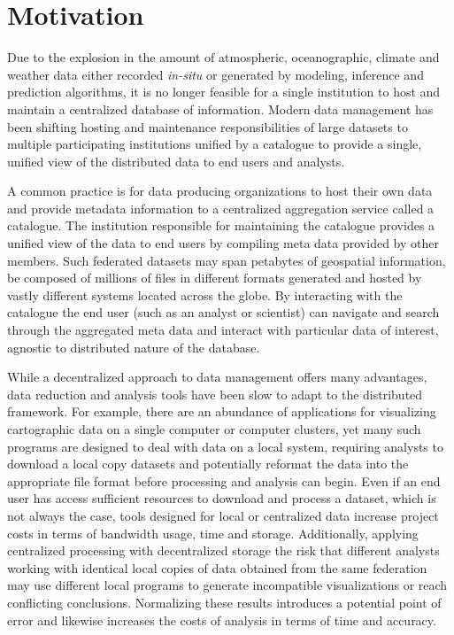 \section{Motivation}
\label{sec:motivation}
Due to the explosion in the amount of atmospheric, oceanographic,
climate and weather data either recorded \emph{in-situ} or generated
by modeling, inference and prediction algorithms, it is no longer
feasible for a single institution to host and maintain a centralized
database of information. Modern data management has been shifting
hosting and maintenance responsibilities of large datasets to multiple
participating institutions unified by a catalogue to provide a single,
unified view of the distributed data to end users and analysts.

A common practice is for data producing organizations to host their
own data and provide metadata information to a centralized aggregation
service called a catalogue. The institution responsible for
maintaining the catalogue provides a unified view of the data to end
users by compiling meta data provided by other members. Such federated
datasets may span petabytes of geospatial information, be composed of
millions of files in different formats generated and hosted by vastly
different systems located across the globe. By interacting with the
catalogue the end user (such as an analyst or scientist) can navigate
and search through the aggregated meta data and interact with
particular data of interest, agnostic to distributed nature of the
database.

While a decentralized approach to data management offers many
advantages, data reduction and analysis tools have been slow to adapt
to the distributed framework. For example, there are an abundance of
applications for visualizing cartographic data on a single computer or
computer clusters, yet many such programs are designed to deal with
data on a local system, requiring analysts to download a local copy
datasets and potentially reformat the data into the appropriate file
format before processing and analysis can begin. Even if an end user
has access sufficient resources to download and process a dataset,
which is not always the case, tools designed for local or centralized
data increase project costs in terms of bandwidth usage, time and
storage. Additionally, applying centralized processing with
decentralized storage the risk that different analysts working with
identical local copies of data obtained from the same federation may
use different local programs to generate incompatible visualizations
or reach conflicting conclusions. Normalizing these results introduces
a potential point of error and likewise increases the costs of
analysis in terms of time and accuracy.


